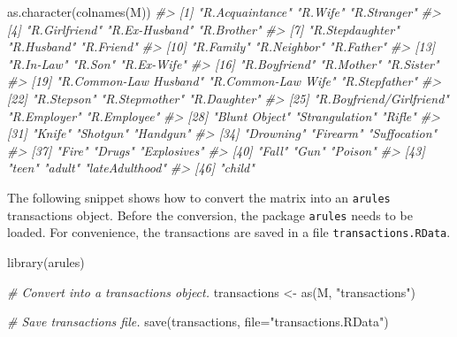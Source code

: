 \documentclass[
  11pt,
]{krantz}
\newenvironment{Shaded}{\begin{snugshade}}{\end{snugshade}}
\newcommand{\AttributeTok}[1]{\textcolor[rgb]{0.61,0.61,0.61}{#1}}
\newcommand{\CommentTok}[1]{\textcolor[rgb]{0.37,0.37,0.37}{\textit{#1}}}
\newcommand{\FunctionTok}[1]{\textcolor[rgb]{0,0,0}{#1}}
\newcommand{\NormalTok}[1]{#1}
\newcommand{\OtherTok}[1]{\textcolor[rgb]{0.37,0.37,0.37}{#1}}
\newcommand{\StringTok}[1]{\textcolor[rgb]{0.5,0.5,0.5}{#1}}
\begin{document}
\begin{Shaded}
\begin{Highlighting}[]
\FunctionTok{as.character}\NormalTok{(}\FunctionTok{colnames}\NormalTok{(M))}
\CommentTok{\#\textgreater{} [1] "R.Acquaintance"         "R.Wife"                 "R.Stranger"            }
\CommentTok{\#\textgreater{} [4] "R.Girlfriend"           "R.Ex{-}Husband"           "R.Brother"             }
\CommentTok{\#\textgreater{} [7] "R.Stepdaughter"         "R.Husband"              "R.Friend"              }
\CommentTok{\#\textgreater{} [10] "R.Family"               "R.Neighbor"             "R.Father"              }
\CommentTok{\#\textgreater{} [13] "R.In{-}Law"               "R.Son"                  "R.Ex{-}Wife"             }
\CommentTok{\#\textgreater{} [16] "R.Boyfriend"            "R.Mother"               "R.Sister"              }
\CommentTok{\#\textgreater{} [19] "R.Common{-}Law Husband"   "R.Common{-}Law Wife"      "R.Stepfather"          }
\CommentTok{\#\textgreater{} [22] "R.Stepson"              "R.Stepmother"           "R.Daughter"            }
\CommentTok{\#\textgreater{} [25] "R.Boyfriend/Girlfriend" "R.Employer"             "R.Employee"            }
\CommentTok{\#\textgreater{} [28] "Blunt Object"           "Strangulation"          "Rifle"                 }
\CommentTok{\#\textgreater{} [31] "Knife"                  "Shotgun"                "Handgun"               }
\CommentTok{\#\textgreater{} [34] "Drowning"               "Firearm"                "Suffocation"           }
\CommentTok{\#\textgreater{} [37] "Fire"                   "Drugs"                  "Explosives"            }
\CommentTok{\#\textgreater{} [40] "Fall"                   "Gun"                    "Poison"                }
\CommentTok{\#\textgreater{} [43] "teen"                   "adult"                  "lateAdulthood"         }
\CommentTok{\#\textgreater{} [46] "child"}
\end{Highlighting}
\end{Shaded}

The following snippet shows how to convert the matrix into an \texttt{arules} transactions object. Before the conversion, the package \texttt{arules} needs to be loaded. For convenience, the transactions are saved in a file \texttt{transactions.RData}.

\begin{Shaded}
\begin{Highlighting}[]
\FunctionTok{library}\NormalTok{(arules)}

\CommentTok{\# Convert into a transactions object.}
\NormalTok{transactions }\OtherTok{\textless{}{-}} \FunctionTok{as}\NormalTok{(M, }\StringTok{"transactions"}\NormalTok{)}

\CommentTok{\# Save transactions file.}
\FunctionTok{save}\NormalTok{(transactions, }\AttributeTok{file=}\StringTok{"transactions.RData"}\NormalTok{)}
\end{Highlighting}
\end{Shaded}
\end{document}
